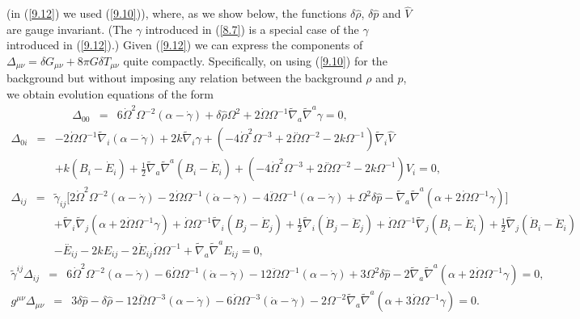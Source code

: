 \documentclass[aps,onecolumn,10pt]{revtex4}
\numberwithin{equation}{section}
\numberwithin{equation}{section}
\begin{document}
%
(in (\ref{9.12}) we used (\ref{9.10})), where, as we show below, the functions $\delta \hat{\rho}$, $\delta \hat{p}$ and $\hat{V} $ are gauge invariant. (The $\gamma$ introduced in (\ref{8.7}) is a special case of the $\gamma$ introduced in (\ref{9.12}).) Given (\ref{9.12}) we can express the components of $\Delta_{\mu\nu}=\delta G_{\mu\nu}+8\pi G\delta T_{\mu\nu}$ quite compactly. Specifically,  on using (\ref{9.10}) for the background but without imposing any relation between the background $\rho$ and $p$, we obtain evolution equations of the form 
%
\begin{eqnarray}
\Delta_{00}&=& 6 \dot{\Omega}^2 \Omega^{-2}(\alpha-\dot\gamma) + \delta \hat{\rho} \Omega^2 + 2 \dot{\Omega} \Omega^{-1} \tilde{\nabla}_{a}\tilde{\nabla}^{a}\gamma=0, 
\label{9.13}
\end{eqnarray}
%
%
\begin{eqnarray}
\Delta_{0i}&=& -2 \dot{\Omega} \Omega^{-1} \tilde{\nabla}_{i}(\alpha - \dot\gamma) + 2 k \tilde{\nabla}_{i}\gamma 
+(-4 \dot{\Omega}^2 \Omega^{-3}  + 2 \overset{..}{\Omega} \Omega^{-2}  - 2 k \Omega^{-1}) \tilde{\nabla}_{i}\hat{V}
\nonumber\\
&& +k(B_i-\dot E_i)+ \tfrac{1}{2} \tilde{\nabla}_{a}\tilde{\nabla}^{a}(B_{i} - \dot{E}_{i})
+ (-4 \dot{\Omega}^2 \Omega^{-3} + 2 \overset{..}{\Omega} \Omega^{-2} - 2 k \Omega^{-1})V_{i}=0,
\label{9.14}
\end{eqnarray}
%
%
\begin{eqnarray}
\Delta_{ij}&=& \tilde{\gamma}_{ij}\big[ 2 \dot{\Omega}^2 \Omega^{-2}(\alpha-\dot\gamma)
-2  \dot{\Omega} \Omega^{-1}(\dot\alpha -\ddot\gamma)-4\ddot\Omega\Omega^{-1}(\alpha-\dot\gamma)+ \Omega^2 \delta \hat{p}-\tilde\nabla_a\tilde\nabla^a( \alpha + 2\dot\Omega \Omega^{-1}\gamma) \big] 
\nonumber\\
&&+\tilde\nabla_i\tilde\nabla_j( \alpha + 2\dot\Omega \Omega^{-1}\gamma)
+\dot{\Omega} \Omega^{-1} \tilde{\nabla}_{i}(B_{j}-\dot E_j)+\tfrac{1}{2} \tilde{\nabla}_{i}(\dot{B}_{j}-\ddot{E}_j)
+\dot{\Omega} \Omega^{-1} \tilde{\nabla}_{j}(B_{i}-\dot E_i)+\tfrac{1}{2} \tilde{\nabla}_{j}(\dot{B}_{i}-\ddot{E}_i)
\nonumber\\
&&- \overset{..}{E}_{ij} - 2 k E_{ij} - 2 \dot{E}_{ij} \dot{\Omega} \Omega^{-1} + \tilde{\nabla}_{a}\tilde{\nabla}^{a}E_{ij}=0,
\label{9.15}
\end{eqnarray}
%
%
\begin{eqnarray}
\tilde{\gamma}^{ij}\Delta_{ij} &=&  6 \dot{\Omega}^2 \Omega^{-2}(\alpha-\dot\gamma)
-6  \dot{\Omega} \Omega^{-1}(\dot\alpha -\ddot\gamma)-12\ddot\Omega\Omega^{-1}(\alpha-\dot\gamma)+ 3\Omega^2 \delta \hat{p}-2\tilde\nabla_a\tilde\nabla^a( \alpha + 2\dot\Omega \Omega^{-1}\gamma)=0,
\label{9.16}
\end{eqnarray}
%
%
\begin{eqnarray}
g^{\mu\nu}\Delta_{\mu\nu}&=& 3 \delta \hat{p} -  \delta \hat{\rho}
-12 \overset{..}{\Omega}  \Omega^{-3}(\alpha - \dot\gamma) -6 \dot{\Omega} \Omega^{-3}(\dot{\alpha} -\ddot\gamma)
-2 \Omega^{-2} \tilde{\nabla}_{a}\tilde{\nabla}^{a}(\alpha +3\dot\Omega\Omega^{-1}\gamma)=0.
\label{9.17}
\end{eqnarray}
%
\end{document}
